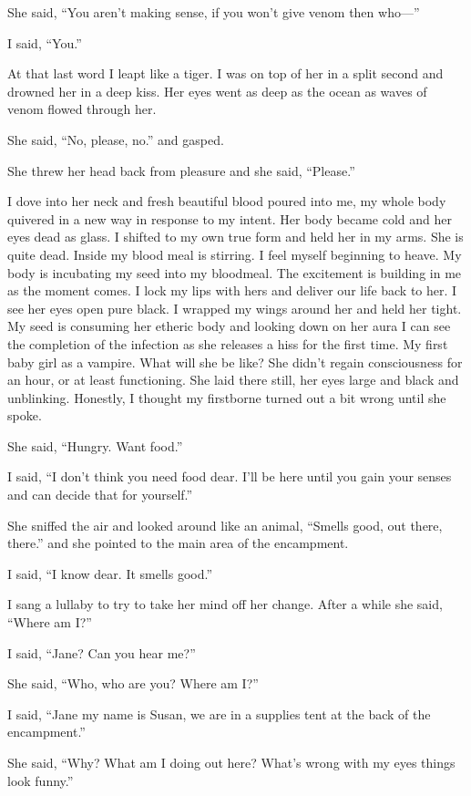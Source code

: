 She said, ``You aren't making sense, if you won't give venom then who---''

I said, ``You.''

At that last word I leapt like a tiger. I was on top of her in a split second and drowned her in a deep kiss. Her eyes went as deep as the ocean as waves of venom flowed through her. 

She said, ``No, please, no.'' and gasped. 

She threw her head back from pleasure and she said, ``Please.''

I dove into her neck and fresh beautiful blood poured into me, my whole body quivered in a new way in response to my intent. Her body became cold and her eyes dead as glass. I shifted to my own true form and held her in my arms. She is quite dead. Inside my blood meal is stirring. I feel myself beginning to heave. My body is incubating my seed into my bloodmeal. The excitement is building in me as the moment comes. I lock my lips with hers and deliver our life back to her. I see her eyes open pure black. I wrapped my wings around her and held her tight. My seed is consuming her etheric body and looking down on her aura I can see the completion of the infection as she releases a hiss for the first time. My first baby girl as a vampire. What will she be like? She didn't regain consciousness for an hour, or at least functioning. She laid there still, her eyes large and black and unblinking. Honestly, I thought my firstborne turned out a bit wrong until she spoke.

She said, ``Hungry. Want food.''

I said, ``I don't think you need food dear. I'll be here until you gain your senses and can decide that for yourself.''

She sniffed the air and looked around like an animal, ``Smells good, out there, there.'' and she pointed to the main area of the encampment.

I said, ``I know dear. It smells good.''

I sang a lullaby to try to take her mind off her change. After a while she said, ``Where am I?''

I said, ``Jane? Can you hear me?''

She said, ``Who, who are you? Where am I?''

I said, ``Jane my name is Susan, we are in a supplies tent at the back of the encampment.''

She said, ``Why? What am I doing out here? What's wrong with my eyes things look funny.''

